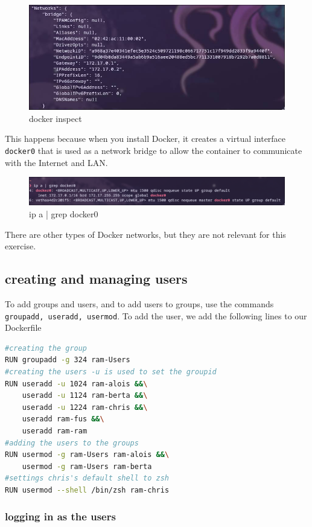 \documentclass[a4paper]{article}
\begin{document}
\begin{figure}[h]
	\centering
	\includegraphics[scale=0.3]{images/docker_inspect_nw.png}
	\caption{docker inspect}
\end{figure}
This happens because when you install Docker, it creates a virtual interface \texttt{docker0} that is used as a network bridge to allow the container to communicate with the Internet and LAN. \cite{docker-networking-video}
\begin{figure}[h]
	\centering
	\includegraphics[scale=0.3]{images/ipadocker.png}
	\caption{ip a | grep docker0}
\end{figure}
There are other types of Docker networks, but they are not relevant for this exercise.\cite{docker-networking-video}

\newpage
\subsection{creating and managing users}

To add groups and users, and to add users to groups, use the commands \texttt{groupadd, useradd, usermod}.
To add the user, we add the following lines to our Dockerfile
\begin{lstlisting}[language=bash]
#creating the group
RUN groupadd -g 324 ram-Users 
#creating the users -u is used to set the groupid
RUN useradd -u 1024 ram-alois &&\
    useradd -u 1124 ram-berta &&\
    useradd -u 1224 ram-chris &&\
    useradd ram-fus &&\
    useradd ram-ram
#adding the users to the groups
RUN usermod -g ram-Users ram-alois &&\
    usermod -g ram-Users ram-berta
#settings chris's default shell to zsh
RUN usermod --shell /bin/zsh ram-chris 
\end{lstlisting}
\subsubsection{logging in as the users}
\end{document}
